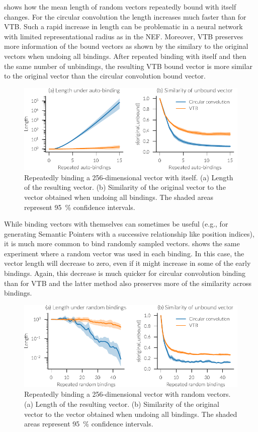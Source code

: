  shows how the mean length of random vectors repeatedly bound with itself changes.
For the circular convolution the length increases much faster than for VTB\@.
Such a rapid increase in length can be problematic in a neural network with limited representational radius as in the NEF\@.
Moreover, VTB preserves more information of the bound vectors as shown by the similary to the original vectors when undoing all bindings.
After repeated binding with itself and then the same number of unbindings, the resulting VTB bound vector is more similar to the original vector than the circular convolution bound vector.
\begin{figure}
    \centering
    \includegraphics{figures/bindings-autoconv}
    \caption[Repeatedly binding a 256-dimensional vector with itself]{Repeatedly binding a 256-dimensional vector with itself. (a) Length of the resulting vector. (b) Similarity of the original vector to the vector obtained when undoing all bindings. The shaded areas represent \SI{95}{\percent} confidence intervals.}\label{fig:bindings-autoconv}
\end{figure}

While binding vectors with themselves can sometimes be useful (e.g., for generating Semantic Pointers with a successive relationship like position indices), it is much more common to bind randomly sampled vectors.
 shows the same experiment where a random vector was used in each binding.
In this case, the vector length will decrease to zero, even if it might increase in some of the early bindings.
Again, this decrease is much quicker for circular convolution binding than for VTB and the latter method also preserves more of the similarity across bindings.
\begin{figure}
    \centering
    \includegraphics{figures/bindings-random}
    \caption[Repeatedly binding a 256-dimensional vector with random vectors]{Repeatedly binding a 256-dimensional vector with random vectors. (a) Length of the resulting vector. (b) Similarity of the original vector to the vector obtained when undoing all bindings. The shaded areas represent \SI{95}{\percent} confidence intervals.}\label{fig:bindings-random}
\end{figure}

